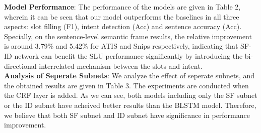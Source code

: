 \documentclass[11pt,a4paper]{article}
\begin{document}
\textbf{Model Performance}: The performance of the models are given in Table 2, wherein it can be seen that our model outperforms the baselines in all three aspects: slot filling (F1), intent detection (Acc) and sentence accuracy (Acc). Specially, on the sentence-level semantic frame results, the relative improvement is around 3.79\% and 5.42\% for ATIS and Snips respectively, indicating that SF-ID network can benefit the SLU performance significantly by introducing the bi-directional interrelated mechanism between the slots and intent.\\
\textbf{Analysis of Seperate Subnets}: We analyze the effect of seperate subnets, and the obtained results are given in Table 3. The experiments are conducted when the CRF layer is added. As we can see, both models including only the SF subnet or the ID subnet have acheived better results than the BLSTM model. Therefore, we believe that both SF subnet and ID subnet have significance in performance improvement.
\end{document}
